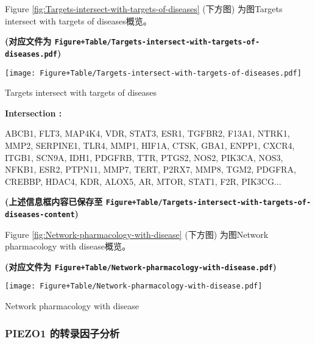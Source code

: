\documentclass[
]{article}
\begin{document}
Figure \ref{fig:Targets-intersect-with-targets-of-diseases} (下方图) 为图Targets intersect with targets of diseases概览。

\textbf{(对应文件为 \texttt{Figure+Table/Targets-intersect-with-targets-of-diseases.pdf})}

\def\@captype{figure}
\begin{center}
\texttt{[image: Figure+Table/Targets-intersect-with-targets-of-diseases.pdf]}
\caption{Targets intersect with targets of diseases}\label{fig:Targets-intersect-with-targets-of-diseases}
\end{center}
\begin{center}\begin{tcolorbox}[colback=gray!10, colframe=gray!50, width=0.9\linewidth, arc=1mm, boxrule=0.5pt]
\textbf{
Intersection
:}

\vspace{0.5em}

    ABCB1, FLT3, MAP4K4, VDR, STAT3, ESR1, TGFBR2, F13A1,
NTRK1, MMP2, SERPINE1, TLR4, MMP1, HIF1A, CTSK, GBA1,
ENPP1, CXCR4, ITGB1, SCN9A, IDH1, PDGFRB, TTR, PTGS2, NOS2,
PIK3CA, NOS3, NFKB1, ESR2, PTPN11, MMP7, TERT, P2RX7, MMP8,
TGM2, PDGFRA, CREBBP, HDAC4, KDR, ALOX5, AR, MTOR, STAT1,
F2R, PIK3CG...

\vspace{2em}
\end{tcolorbox}
\end{center}

\textbf{(上述信息框内容已保存至 \texttt{Figure+Table/Targets-intersect-with-targets-of-diseases-content})}

Figure \ref{fig:Network-pharmacology-with-disease} (下方图) 为图Network pharmacology with disease概览。

\textbf{(对应文件为 \texttt{Figure+Table/Network-pharmacology-with-disease.pdf})}

\def\@captype{figure}
\begin{center}
\texttt{[image: Figure+Table/Network-pharmacology-with-disease.pdf]}
\caption{Network pharmacology with disease}\label{fig:Network-pharmacology-with-disease}
\end{center}

\hypertarget{piezo1-ux7684ux8f6cux5f55ux56e0ux5b50ux5206ux6790}{%
\subsubsection{PIEZO1 的转录因子分析}\label{piezo1-ux7684ux8f6cux5f55ux56e0ux5b50ux5206ux6790}}
\end{document}
